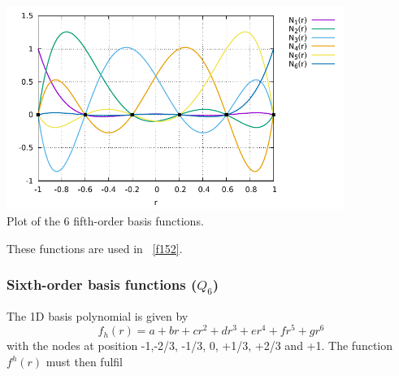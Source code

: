 \begin{center}
\includegraphics[width=11cm]{images/basis1D/Q5.pdf}\\
{\captionfont Plot of the 6 fifth-order basis functions.}
\end{center}


These functions are used in \stone~\ref{f152}.






\subsubsection{Sixth-order basis functions ($Q_6$) \label{sec:bf6}}

The 1D basis polynomial is given by
\[
f_h(r)=a+br+cr^2+dr^3+er^4+fr^5+gr^6
\]
with the nodes at position -1,-2/3, -1/3, 0, +1/3, +2/3 and +1.
The function $f^h(r)$ must then fulfil 


